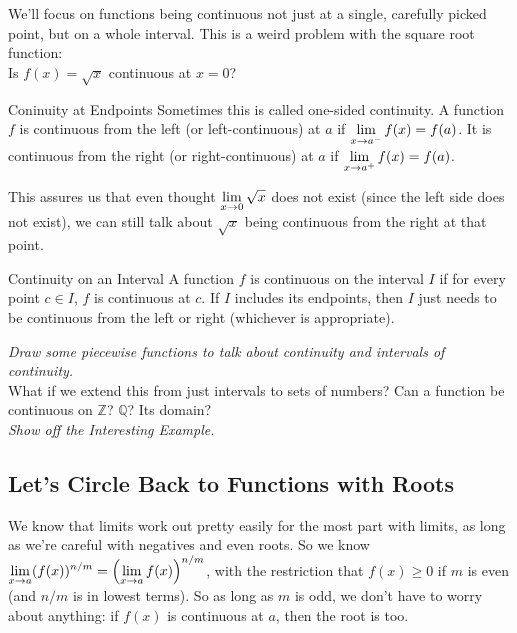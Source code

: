 We'll focus on functions being continuous not just at a single, carefully picked point, but on a whole interval. This is a weird problem with the square root function:\\

Is $f(x) = \sqrt{x}$ continuous at $x=0$?

\begin{defn}{Coninuity at Endpoints}
Sometimes this is called one-sided continuity. A function $f$ is continuous from the left (or left-continuous) at $a$ if $\displaystyle \lim_{x\to a^-}f(x) = f(a)$. It is continuous from the right (or right-continuous) at $a$ if $\displaystyle \lim_{x\to a^+}f(x) = f(a)$.
\end{defn}

This assures us that even thought $\displaystyle \lim_{x\to 0}\sqrt{x}$ does not exist (since the left side does not exist), we can still talk about $\sqrt{x}$ being continuous from the right at that point.

\begin{defn}{Continuity on an Interval}
A function $f$ is continuous on the interval $I$ if for every point $c\in I$, $f$ is continuous at $c$. If $I$ includes its endpoints, then $I$ just needs to be continuous from the left or right (whichever is appropriate).
\end{defn}

\textit{Draw some piecewise functions to talk about continuity and intervals of continuity.}\\

What if we extend this from just intervals to sets of numbers? Can a function be continuous on $\mathbb{Z}$? $\mathbb{Q}$? Its domain?\\

\textit{Show off the Interesting Example.}

\subsection*{Let's Circle Back to Functions with Roots}

We know that limits work out pretty easily for the most part with limits, as long as we're careful with negatives and even roots. So we know $\displaystyle \lim_{x\to a} (f(x))^{n/m} = \left(\displaystyle \lim_{x\to a}f(x)\right)^{n/m}$, with the restriction that $f(x)\geq 0$ if $m$ is even (and $n/m$ is in lowest terms). So as long as $m$ is odd, we don't have to worry about anything: if $f(x)$ is continuous at $a$, then the root is too.\\

